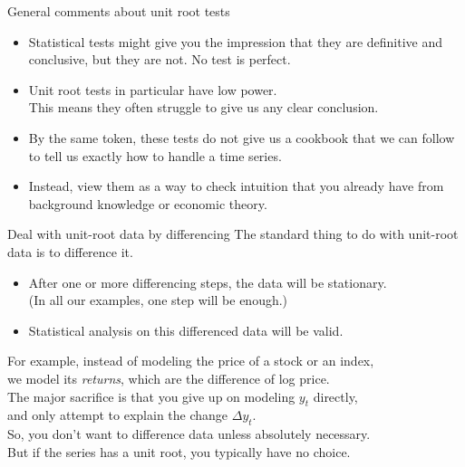 \documentclass[t,12pt]{beamer}
\begin{document}
\begin{frame}[c]{General comments about unit root tests}
\begin{itemize}
\item Statistical tests might give you the impression that they are definitive and conclusive, but they are not. No test is perfect. 
\medskip
\item Unit root tests in particular have low power. 
\\ This means they often struggle to give us any clear conclusion.
\medskip
\item By the same token, these tests do not give us a cookbook that we can follow to tell us exactly how to handle a time series.
\medskip
\item Instead, view them as a way to check intuition that you already have from background knowledge or economic theory. 
\end{itemize}
\end{frame}

\begin{frame}[c]{Deal with unit-root data by differencing}
The standard thing to do with unit-root data is to difference it.
\begin{itemize}
\smallskip
\item After one or more differencing steps, the data will be stationary.
\\ (In all our examples, one step will be enough.)
\item Statistical analysis on this differenced data will be valid.
\end{itemize}
\medskip
For example, instead of modeling the price of a stock or an index, 
\\ we model its \emph{returns}, which are the difference of log price.
\\ \medskip
The major sacrifice is that you give up on modeling $y_t$ directly, 
\\ and only attempt to explain the change $\Delta y_t$.
\\ \medskip
So, you don't want to difference data unless absolutely necessary.
\\ \medskip
But if the series has a unit root, you typically have no choice.
\end{frame}
\end{document}

